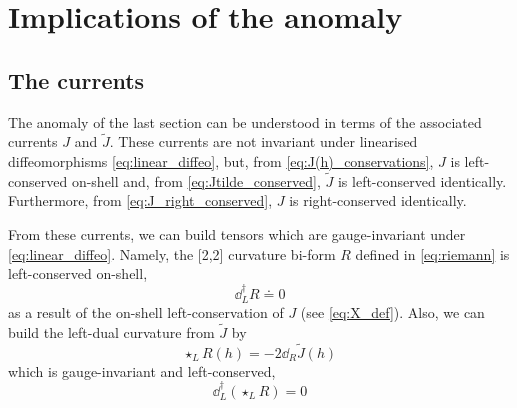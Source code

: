 \section{Implications of the anomaly}
\label{sec:massless_graviton}

\subsection{The currents}

The anomaly of the last section can be understood in terms of the associated currents $J$ and $\tilde{J}$. 
These currents are not invariant under linearised diffeomorphisms \eqref{eq:linear_diffeo}, but, from \eqref{eq:J(h)_conservations}, $J$ is left-conserved on-shell and, from \eqref{eq:Jtilde_conserved}, $\tilde{J}$ is left-conserved identically.
Furthermore, from \eqref{eq:J_right_conserved}, $J$ is right-conserved identically.

From these currents, we can build tensors which are gauge-invariant under \eqref{eq:linear_diffeo}. Namely, the [2,2] curvature bi-form $R$ defined in \eqref{eq:riemann} is left-conserved on-shell,
\begin{equation}
    \dd_L^\dag R \doteq 0
\end{equation}
as a result of the on-shell left-conservation of $J$ (see \eqref{eq:X_def}). Also, we can build the left-dual curvature from $\tilde{J}$ by
\begin{equation}\label{eq:Y_def}
    \star_L R(h) = -2\dd_R \tilde{J}(h)
\end{equation}
which is gauge-invariant and left-conserved,
\begin{equation}
    \dd_L^\dag (\star_L R) = 0
\end{equation}


